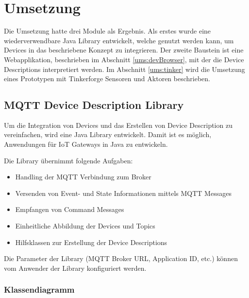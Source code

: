 \chapter{Umsetzung}
\label{chap:umsetzung}

Die Umsetzung hatte drei Module als Ergebnis. Als erstes wurde eine wiederverwendbare Java Library entwickelt, welche genutzt werden kann, um Devices in das beschriebene Konzept zu integrieren. Der zweite Baustein ist eine Webapplikation, beschrieben im Abschnitt \ref{ums:devBrowser}, mit der die Device Descriptions interpretiert werden. Im Abschnitt \ref{ums:tinker} wird die Umsetzung eines Prototypen mit Tinkerforge Sensoren und Aktoren beschrieben.

\section{MQTT Device Description Library}
Um die Integration von Devices und das Erstellen von Device Description zu vereinfachen, wird eine Java Library entwickelt. Damit ist es möglich, Anwendungen für IoT Gateways in Java zu entwickeln.

Die Library übernimmt folgende Aufgaben:
\begin{itemize}
\item Handling der MQTT Verbindung zum Broker
\item Versenden von Event- und State Informationen mittels MQTT Messages
\item Empfangen von Command Messages
\item Einheitliche Abbildung der Devices und Topics
\item Hilfsklassen zur Erstellung der Device Descriptions
\end{itemize}

Die Parameter der Library (MQTT Broker URL, Application ID, etc.) können vom Anwender der Library konfiguriert werden.


\subsection{Klassendiagramm}

